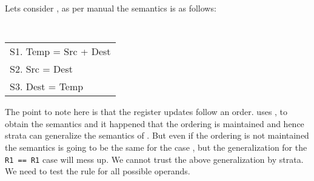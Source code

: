 Lets consider , as per manual the semantics is
as follows:

{\small \tt 
  \begin{tabular}[b]{l}
   S1. Temp = Src + Dest \\ 
   S2. Src  = Dest \\
   S3. Dest = Temp \\
  \end{tabular}
}


The point to note here is that the register updates follow an order.  \Strata
uses , to obtain the semantics and it happened that
the ordering is maintained and hence strata can generalize the semantics of
. But even if the ordering is not maintained the
semantics is going to be the same for the case , but the generalization
for the \texttt{R1\ ==\ R1} case will mess up.  We cannot trust the above
generalization by strata. We need to test the \K rule for all possible operands.


